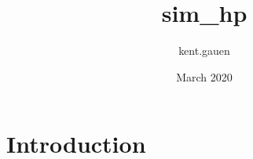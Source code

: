 \documentclass{article}
\title{sim_hp}
\author{kent.gauen }
\date{March 2020}
\begin{document}
\maketitle

\section{Introduction}
\end{document}
